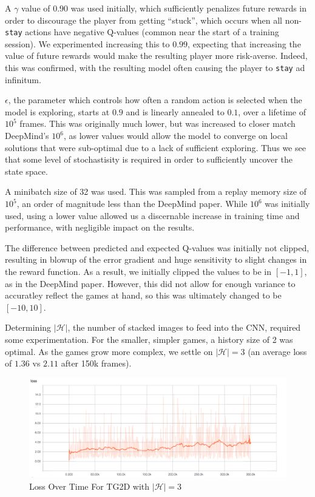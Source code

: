 \documentclass[12pt]{article}
\begin{document}
A $\gamma$ value of $0.90$ was used initially, which sufficiently penalizes future rewards in order to discourage the player from getting ``stuck'', which occurs when all non-\texttt{stay} actions have negative Q-values (common near the start of a training session). We experimented increasing this to $0.99$, expecting that increasing the value of future rewards would make the resulting player more risk-averse. Indeed, this was confirmed, with the resulting model often causing the player to \texttt{stay} ad infinitum.

$\epsilon$, the parameter which controls how often a random action is selected when the model is exploring, starts at $0.9$ and is linearly annealed to $0.1$, over a lifetime of $10^5$ frames. This was originally much lower, but was increased to closer match DeepMind's $10^6$, as lower values would allow the model to converge on local solutions that were sub-optimal due to a lack of sufficient exploring. Thus we see that some level of stochastisity is required in order to sufficiently uncover the state space.

A minibatch size of 32 was used. This was sampled from a replay memory size of $10^5$, an order of magnitude less than the DeepMind paper. While $10^6$ was initially used, using a lower value allowed us a discernable increase in training time and performance, with negligible impact on the results.

The difference between predicted and expected Q-values was initially not clipped, resulting in blowup of the error gradient and huge sensitivity to slight changes in the reward function. As a result, we initially clipped the values to be in $[-1, 1]$, as in the DeepMind paper. However, this did not allow for enough variance to accuratley reflect the games at hand, so this was ultimately changed to be $[-10, 10]$.

Determining $|\mathcal{H}|$, the number of stacked images to feed into the CNN, required some experimentation. For the smaller, simpler games, a history size of 2 was optimal. As the games grow more complex, we settle on $|\mathcal{H}| = 3$ (an average loss of $1.36$ vs $2.11$ after 150k frames).

\begin{figure}[H]
  \includegraphics[width=1\textwidth]{report/history_size_3}
  \centering
  \caption{Loss Over Time For TG2D with $|\mathcal{H}| = 3$}
  \label{fig:tg2dh3loss}
\end{figure}
\end{document}
